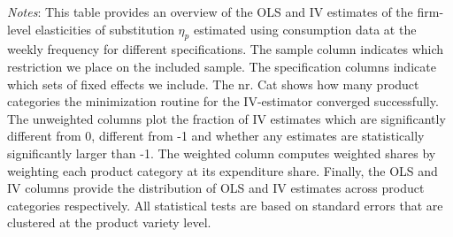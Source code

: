 \begin{landscape}
    \begin{table}[H]
        \centering
        \caption{Weekly Firm-level Elasticities: Dispersion instrument}
        \label{tab: app_elas_eta_cats_weekly_q}
        \begin{spacing}{1}
        \end{spacing}
        \parbox{1.2\textwidth}{
        \vspace{10pt}
        \begin{spacing}{1} 
            {\footnotesize 
            \textit{Notes}: This table provides an overview of the OLS and IV estimates of the firm-level elasticities of substitution $\eta_p$ estimated using consumption data at the weekly frequency for different specifications. The sample column indicates which restriction we place on the included sample. The specification columns indicate which sets of fixed effects we include. The nr. Cat shows how many product categories the minimization routine for the IV-estimator converged successfully. The unweighted columns plot the fraction of IV estimates which are significantly different from 0, different from -1 and whether any estimates are statistically significantly larger than -1. The weighted column computes weighted shares by weighting each product category at its expenditure share. Finally, the OLS and IV columns provide the distribution of OLS and IV estimates across product categories respectively. All statistical tests are based on standard errors that are clustered at the product variety level.}
            \end{spacing}}
    \end{table}
\end{landscape}

